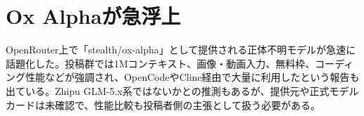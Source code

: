 \section{Ox Alphaが急浮上}
OpenRouter上で「stealth/ox-alpha」として提供される正体不明モデルが急速に話題化した。投稿群では1Mコンテキスト、画像・動画入力、無料枠、コーディング性能などが強調され、OpenCodeやCline経由で大量に利用したという報告も出ている。Zhipu GLM-5.x系ではないかとの推測もあるが、提供元や正式モデルカードは未確認で、性能比較も投稿者側の主張として扱う必要がある。
